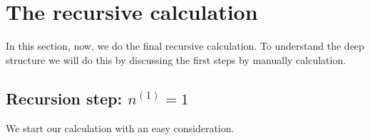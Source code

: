 \chapter{The recursive calculation}
\label{ch:therecursivecalculation}
\minitoc
In this section, now, we do the final recursive calculation. To understand the deep structure we will do this by discussing the first steps by manually calculation.
\section{Recursion step: $n^{\left(1\right)} = 1$}
\label{s:recursionstepn1_1}
We start our calculation with an easy consideration.
